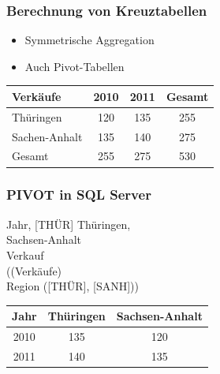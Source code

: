     
    \begin{frame}
    \frametitle{Berechnung von Kreuztabellen}
    
    \begin{itemize}
    \item Symmetrische Aggregation
    \item Auch Pivot-Tabellen
    \end{itemize}
    
    \begin{center}
    \begin{tabular}{|l||c|c|c|}
    \hline
    \rowcolor{Gray} Verkäufe & 2010 & 2011 & Gesamt \\
    \hline \hline
    Thüringen & 120 & 135 & 255 \\
    \hline
    Sachen-Anhalt & 135 & 140 & 275 \\
    \hline
    Gesamt & 255 & 275 & 530 \\
    \hline
    \end{tabular}
    \end{center}
    
    \end{frame}
    
    
    \begin{frame}
    \frametitle{PIVOT in SQL Server}
    
    \begin{sql}
       Jahr, [THÜR]  Thüringen, \\
      \1 [SANH]  Sachsen-Anhalt \\
       Verkauf \\
       ((Verkäufe)  \\
      \1 Region  ([THÜR], [SANH]))
    \end{sql}
    
    \begin{center}
    \begin{tabular}{|c|c|c|}
    \hline
    \rowcolor{Gray} Jahr & Thüringen & Sachsen-Anhalt \\
    \hline
    \hline
    2010 & 135 & 120 \\
    \hline
    2011 & 140 & 135 \\
    \hline
    \end{tabular}
    \end{center}
    
    \end{frame}
    

